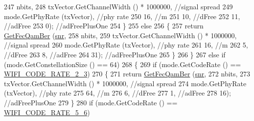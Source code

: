 \begin{DoxyCode}
247                                    nbits,
248                                    txVector.GetChannelWidth () * 1000000, \textcolor{comment}{//signal spread}
249                                    mode.GetPhyRate (txVector), \textcolor{comment}{//phy rate}
250                                    16, \textcolor{comment}{//m}
251                                    10, \textcolor{comment}{//dFree}
252                                    11, \textcolor{comment}{//adFree}
253                                    0); \textcolor{comment}{//adFreePlusOne}
254             \}
255           \textcolor{keywordflow}{else}
256             \{
257               \textcolor{keywordflow}{return} \hyperlink{classns3_1_1YansErrorRateModel_a456a5ba3fc8c6a9fe67ed25971364ff0}{GetFecQamBer} (\hyperlink{lte__amc_8m_a7543c5e4e80c828b652e0c63e4a6de70}{snr},
258                                    nbits,
259                                    txVector.GetChannelWidth () * 1000000, \textcolor{comment}{//signal spread}
260                                    mode.GetPhyRate (txVector), \textcolor{comment}{//phy rate}
261                                    16, \textcolor{comment}{//m}
262                                    5, \textcolor{comment}{//dFree}
263                                    8, \textcolor{comment}{//adFree}
264                                    31); \textcolor{comment}{//adFreePlusOne}
265             \}
266         \}
267       \textcolor{keywordflow}{else} \textcolor{keywordflow}{if} (mode.GetConstellationSize () == 64)
268         \{
269           \textcolor{keywordflow}{if} (mode.GetCodeRate () == \hyperlink{namespacens3_aeaf3a86fd4bdb7829955238fba43e2ada161e88df840a9d1ed66f6f8edd0d6415}{WIFI\_CODE\_RATE\_2\_3})
270             \{
271               \textcolor{keywordflow}{return} \hyperlink{classns3_1_1YansErrorRateModel_a456a5ba3fc8c6a9fe67ed25971364ff0}{GetFecQamBer} (\hyperlink{lte__amc_8m_a7543c5e4e80c828b652e0c63e4a6de70}{snr},
272                                    nbits,
273                                    txVector.GetChannelWidth () * 1000000, \textcolor{comment}{//signal spread}
274                                    mode.GetPhyRate (txVector), \textcolor{comment}{//phy rate}
275                                    64, \textcolor{comment}{//m}
276                                    6, \textcolor{comment}{//dFree}
277                                    1, \textcolor{comment}{//adFree}
278                                    16); \textcolor{comment}{//adFreePlusOne}
279             \}
280           \textcolor{keywordflow}{if} (mode.GetCodeRate () == \hyperlink{namespacens3_aeaf3a86fd4bdb7829955238fba43e2adaf0309d61b4cf97e5718f6d3b9fdba3aa}{WIFI\_CODE\_RATE\_5\_6})

\end{DoxyCode}
